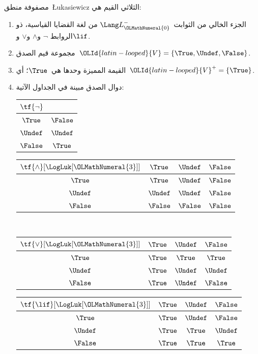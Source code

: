 \documentclass[../../../include/open-logic-section]{subfiles}
\begin{document}
\begin{defn}
مصفوفة منطق~\L ukasiewicz الثلاثي القيم هي:
\begin{enumerate}
  \item الجزء الخالي من الثوابت~$\Lang L_{\OLMathNumeral{0}}^{-}$ من لغة القضايا القياسية، ذو الروابط
  $\lnot$ و$\land$ و$\lor$ و$\lif$.
  \item مجموعة قيم الصدق~${\OLId{latin-looped}{V}} = \{\True, \Undef, \False\}$.
  \item القيمة المميزة وحدها هي~$\True$؛ أي~${\OLId{latin-looped}{V}}^+ = \{\True\}$.
  \item دوال الصدق مبينة في الجداول الآتية:
  \begin{center}
    \begin{tabular}{c|c}
      $\tf{\lnot}$ & \\
      \hline
      $\True$ & $\False$ \\
      $\Undef$ & $\Undef$ \\
      $\False$ & $\True$
    \end{tabular}
    \quad
    \begin{tabular}{c|ccc}
      $\tf{\land}[\LogLuk[{\OLMathNumeral{3}}]]$ & $\True$ & $\Undef$ & $\False$ \\
      \hline
      $\True$ & $\True$ & $\Undef$ & $\False$ \\
      $\Undef$ & $\Undef$ & $\Undef$ & $\False$\\
      $\False$ & $\False$ & $\False$ & $\False$
    \end{tabular}
    \\[2ex]
    \begin{tabular}{c|ccc}
      $\tf{\lor}[\LogLuk[{\OLMathNumeral{3}}]]$ & $\True$ & $\Undef$ & $\False$ \\
      \hline
      $\True$ & $\True$ & $\True$ & $\True$ \\
      $\Undef$ & $\True$ & $\Undef$ & $\Undef$ \\
      $\False$ & $\True$ & $\Undef$ & $\False$
    \end{tabular}
    \quad
    \begin{tabular}{c|ccc}
      $\tf{\lif}[\LogLuk[{\OLMathNumeral{3}}]]$ & $\True$ & $\Undef$ & $\False$ \\
      \hline
      $\True$ & $\True$ & $\Undef$ & $\False$ \\
      $\Undef$ & $\True$ & $\True$ & $\Undef$  \\
      $\False$ & $\True$ & $\True$ & $\True$
    \end{tabular}
  \end{center}
\end{enumerate}
\end{defn}
\end{document}
